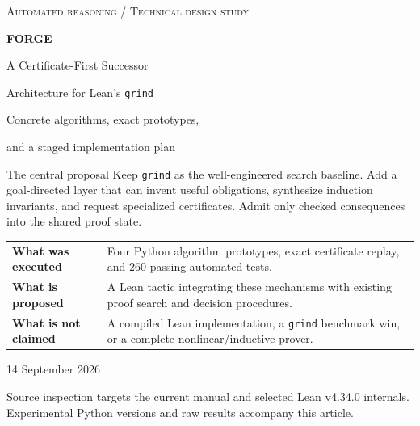 \documentclass[11pt,a4paper]{article}
\newcommand{\grind}{\texttt{grind}}
\begin{document}
\begin{titlepage}
\vspace*{12mm}
{\color{ink}\Large\textsc{Automated reasoning / Technical design study}\par}
\vspace{16mm}
{\color{ink}\fontsize{38}{43}\selectfont\bfseries FORGE\par}
\vspace{5mm}
{\LARGE A Certificate-First Successor\par Architecture for Lean's \texttt{grind}\par}
\vspace{10mm}
{\large Concrete algorithms, exact prototypes,\par and a staged implementation plan\par}
\vspace{12mm}
\begin{noteBox}{The central proposal}
Keep \grind{} as the well-engineered search baseline. Add a goal-directed layer that can invent useful obligations, synthesize induction invariants, and request specialized certificates. Admit only checked consequences into the shared proof state.
\end{noteBox}
\vspace{5mm}
\begin{tabularx}{\textwidth}{@{}lX@{}}
\toprule
\textbf{What was executed} & Four Python algorithm prototypes, exact certificate replay, and 260 passing automated tests.\\
\textbf{What is proposed} & A Lean tactic integrating these mechanisms with existing proof search and decision procedures.\\
\textbf{What is not claimed} & A compiled Lean implementation, a \grind{} benchmark win, or a complete nonlinear/inductive prover.\\
\bottomrule
\end{tabularx}
\vfill
{\large 14 September 2026\par}
{\small Source inspection targets the current manual and selected Lean v4.34.0 internals. Experimental Python versions and raw results accompany this article.}
\end{titlepage}
\end{document}
